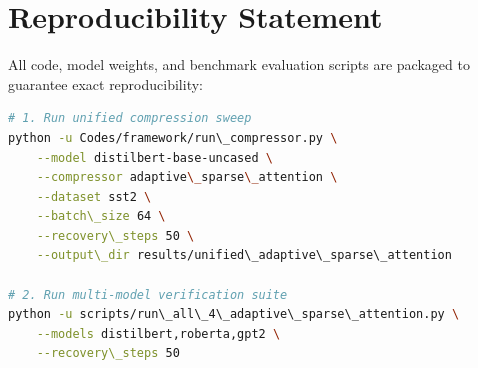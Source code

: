 \section{Reproducibility Statement}
All code, model weights, and benchmark evaluation scripts are packaged to guarantee exact reproducibility:
\begin{lstlisting}[language=bash]
# 1. Run unified compression sweep
python -u Codes/framework/run\_compressor.py \
    --model distilbert-base-uncased \
    --compressor adaptive\_sparse\_attention \
    --dataset sst2 \
    --batch\_size 64 \
    --recovery\_steps 50 \
    --output\_dir results/unified\_adaptive\_sparse\_attention

# 2. Run multi-model verification suite
python -u scripts/run\_all\_4\_adaptive\_sparse\_attention.py \
    --models distilbert,roberta,gpt2 \
    --recovery\_steps 50
\end{lstlisting}
